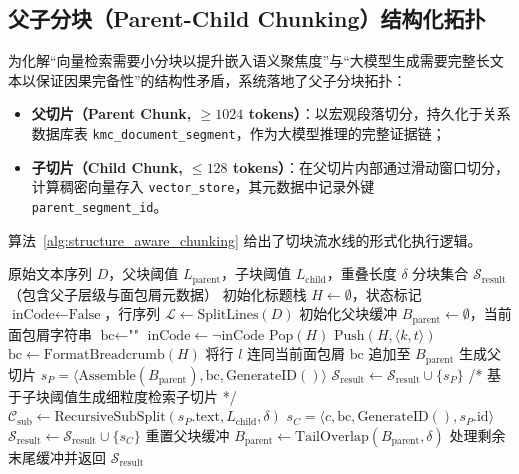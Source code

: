 \subsection{父子分块（Parent-Child Chunking）结构化拓扑}
为化解“向量检索需要小分块以提升嵌入语义聚焦度”与“大模型生成需要完整长文本以保证因果完备性”的结构性矛盾，系统落地了父子分块拓扑：
\begin{itemize}
    \item \textbf{父切片（Parent Chunk, $\ge 1024$ tokens）}：以宏观段落切分，持久化于关系数据库表 \texttt{kmc\_document\_segment}，作为大模型推理的完整证据链；
    \item \textbf{子切片（Child Chunk, $\le 128$ tokens）}：在父切片内部通过滑动窗口切分，计算稠密向量存入 \texttt{vector\_store}，其元数据中记录外键 \texttt{parent\_segment\_id}。
\end{itemize}
算法~\ref{alg:structure_aware_chunking} 给出了切块流水线的形式化执行逻辑。

\begin{algorithm}[htbp]
    \caption{结构感知 Markdown AST 切分与父子拓扑关联算法}
    \label{alg:structure_aware_chunking}
    \begin{algorithmic}[1]
        \Require 原始文本序列 $D$，父块阈值 $L_{\text{parent}}$，子块阈值 $L_{\text{child}}$，重叠长度 $\delta$
        \Ensure 分块集合 $\mathcal{S}_{\text{result}}$（包含父子层级与面包屑元数据）
        \State 初始化标题栈 $H \leftarrow \emptyset$，状态标记 $\text{inCode} \leftarrow \text{False}$，行序列 $\mathcal{L} \leftarrow \text{SplitLines}(D)$
        \State 初始化父块缓冲 $B_{\text{parent}} \leftarrow \emptyset$，当前面包屑字符串 $\text{bc} \leftarrow \text{""}$
        \State $\text{inCode} \leftarrow \neg \text{inCode}$
        \EndIf
        \State $\text{Pop}(H)$
        \EndWhile
        \State $\text{Push}(H, \langle k, t \rangle)$
        \State $\text{bc} \leftarrow \text{FormatBreadcrumb}(H)$
        \EndIf
        \State 将行 $l$ 连同当前面包屑 $\text{bc}$ 追加至 $B_{\text{parent}}$
        \State 生成父切片 $s_P = \langle \text{Assemble}(B_{\text{parent}}), \text{bc}, \text{GenerateID}() \rangle$
        \State $\mathcal{S}_{\text{result}} \leftarrow \mathcal{S}_{\text{result}} \cup \{s_P\}$
        \State /* 基于子块阈值生成细粒度检索子切片 */
        \State $\mathcal{C}_{\text{sub}} \leftarrow \text{RecursiveSubSplit}(s_P.\text{text}, L_{\text{child}}, \delta)$
        \State $s_C = \langle c, \text{bc}, \text{GenerateID}(), s_P.\text{id} \rangle$
        \State $\mathcal{S}_{\text{result}} \leftarrow \mathcal{S}_{\text{result}} \cup \{s_C\}$
        \EndFor
        \State 重置父块缓冲 $B_{\text{parent}} \leftarrow \text{TailOverlap}(B_{\text{parent}}, \delta)$
        \EndIf
        \EndFor
        \State 处理剩余末尾缓冲并返回 $\mathcal{S}_{\text{result}}$
    \end{algorithmic}
\end{algorithm}

